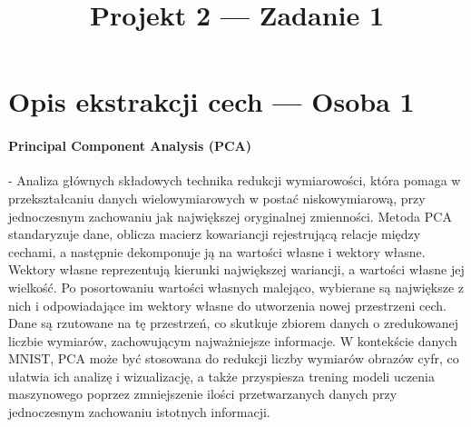 \documentclass[10pt]{article}
\title{Projekt 2 --- Zadanie 1}
\begin{document}
\maketitle
\normalsize
\section{Opis ekstrakcji cech --- Osoba 1}

\paragraph*{Principal Component Analysis (PCA)} - Analiza głównych składowych technika redukcji wymiarowości, która pomaga w przekształcaniu danych wielowymiarowych w postać niskowymiarową, przy jednoczesnym zachowaniu jak największej oryginalnej zmienności.
Metoda PCA standaryzuje dane, oblicza macierz kowariancji rejestrującą relacje między cechami, a następnie dekomponuje ją na wartości własne i wektory własne. Wektory własne reprezentują kierunki największej wariancji, a wartości własne jej wielkość. Po posortowaniu wartości własnych malejąco, wybierane są największe z nich i odpowiadające im wektory własne do utworzenia nowej przestrzeni cech. Dane są rzutowane na tę przestrzeń, co skutkuje zbiorem danych o zredukowanej liczbie wymiarów, zachowującym najważniejsze informacje.
W kontekście danych MNIST, PCA może być stosowana do redukcji liczby wymiarów obrazów cyfr, co ułatwia ich analizę i wizualizację, a także przyspiesza trening modeli uczenia maszynowego poprzez zmniejszenie ilości przetwarzanych danych przy jednoczesnym zachowaniu istotnych informacji.
\end{document}
